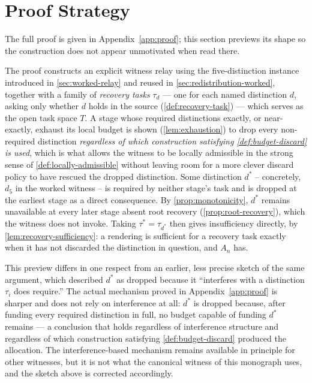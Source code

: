 \section{Proof Strategy}

The full proof is given in Appendix~\ref{app:proof}; this section
previews its shape so the construction does not appear unmotivated when
read there.

\begin{proofsketch}
The proof constructs an explicit witness relay using the five-distinction
instance introduced in \cref{sec:worked-relay} and reused in
\cref{sec:redistribution-worked}, together with a family of
\emph{recovery tasks} $\tau_d$ --- one for each named distinction $d$,
asking only whether $d$ holds in the source
(\cref{def:recovery-task}) --- which serves as the open task space $T$.
A stage whose required distinctions exactly, or near-exactly, exhaust its
local budget is shown (\cref{lem:exhaustion}) to drop every non-required
distinction \emph{regardless of which construction satisfying
\cref{def:budget-discard} is used}, which is what allows the witness to
be locally admissible in the strong sense of \cref{def:locally-admissible}
without leaving room for a more clever discard policy to have rescued the
dropped distinction. Some distinction $d^*$ -- concretely, $d_5$ in the
worked witness -- is required by neither stage's task and is dropped at
the earliest stage as a direct consequence. By
\cref{prop:monotonicity}, $d^*$ remains unavailable at every later stage
absent root recovery (\cref{prop:root-recovery}), which the witness does
not invoke. Taking $\tau^* = \tau_{d^*}$ then gives insufficiency
directly, by \cref{lem:recovery-sufficiency}: a rendering is sufficient
for a recovery task exactly when it has not discarded the distinction in
question, and $A_n$ has.
\end{proofsketch}

This preview differs in one respect from an earlier, less precise sketch
of the same argument, which described $d^*$ as dropped because it
``interferes with a distinction $\tau_i$ does require.'' The actual
mechanism proved in Appendix~\ref{app:proof} is sharper and does not rely
on interference at all: $d^*$ is dropped because, after funding every
required distinction in full, no budget capable of funding $d^*$ remains
--- a conclusion that holds regardless of interference structure and
regardless of which construction satisfying \cref{def:budget-discard}
produced the allocation. The interference-based mechanism remains
available in principle for other witnesses, but it is not what the
canonical witness of this monograph uses, and the sketch above is
corrected accordingly.


